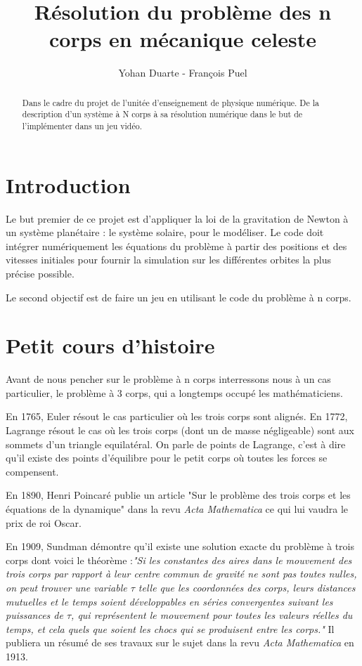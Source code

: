 \documentclass[a4paper]{article}
\title{Résolution du problème des n corps en mécanique celeste}
\author{Yohan Duarte - François Puel}
\begin{document}
\maketitle
\begin{abstract}
Dans le cadre du projet de l'unitée d'enseignement de physique numérique.
De la description d'un système à N corps à sa résolution numérique dans le but de l'implémenter dans un jeu vidéo.
\end{abstract}


\newpage
\tableofcontents

\newpage
\section{Introduction}
\label{sec:Introduction}

Le but premier de ce projet est d'appliquer la loi de la gravitation de Newton à un système planétaire : le système solaire, pour le modéliser. Le code doit intégrer numériquement les équations du problème à partir des positions et des vitesses initiales pour fournir la simulation sur les différentes orbites la plus précise possible.

Le second objectif est de faire un jeu en utilisant le code du problème à n corps.

\section{Petit cours d'histoire}
Avant de nous pencher sur le problème à n corps interressons nous à un cas particulier, le problème à 3 corps, qui a longtemps occupé les mathématiciens.

En 1765, Euler résout le cas particulier où les trois corps sont alignés. En 1772, Lagrange résout le cas où les trois corps (dont un de masse négligeable) sont aux sommets d'un triangle equilatéral. On parle de points de Lagrange, c'est à dire qu'il existe des points d'équilibre pour le petit corps où toutes les forces se compensent.

En 1890, Henri Poincaré publie un article "Sur le problème des trois corps et les équations de la dynamique" dans la revu \textit{Acta Mathematica} ce qui lui vaudra le prix de roi Oscar.

En 1909, Sundman démontre qu'il existe une solution exacte du problème à trois corps dont voici le théorème :\textit{"Si les constantes des aires dans le mouvement des trois corps par rapport à leur centre commun de gravité ne sont pas toutes nulles, on peut trouver une variable $\tau$ telle que les coordonnées des corps, leurs distances mutuelles et le temps soient développables en séries convergentes suivant les puissances de $\tau$, qui représentent le mouvement pour toutes les valeurs réelles du temps, et cela quels que soient les chocs qui se produisent entre les corps."}
Il publiera un résumé de ses travaux sur le sujet dans la revu \textit{Acta Mathematica} en 1913.
\end{document}
